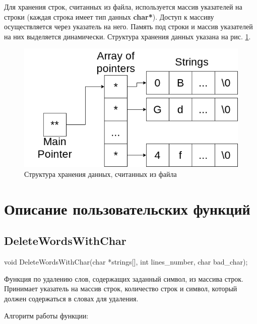 \documentclass[12pt,a4paper]{article}  %
\begin{document}
	Для хранения строк, считанных из файла, используется массив указателей на строки (каждая строка имеет тип данных \textbf{char*}). Доступ к массиву осуществляется через указатель на него. Память под строки и массив указателей на них выделяется динамически. Структура хранения данных указана на рис. \ref{data_schema}.
	\begin{figure}[hpt!]
		\centering
	 	\includegraphics[width=0.6\linewidth]{photo/data_schema}
	 	\caption{Структура хранения данных, считанных из файла}
	 	\label{data_schema}
	\end{figure}
	
	\section*{Описание пользовательских функций}
	
	\subsection*{DeleteWordsWithChar}
	void DeleteWordsWithChar(char *strings[], int lines\_number, char bad\_char);
	
	Функция по удалению слов, содержащих заданный символ, из массива строк. Принимает указатель на массив строк, количество строк и символ, который должен содержаться в словах для удаления.
	
	Алгоритм работы функции:
	
\end{document}
